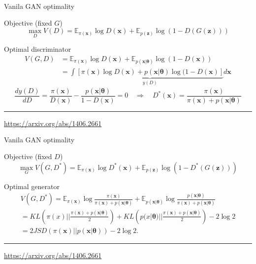 \documentclass{beamer}
\newcommand{\bx}{\mathbf{x}}
\newcommand{\bz}{\mathbf{z}}
\newcommand{\bbE}{\mathbb{E}}
\newcommand{\btheta}{\boldsymbol{\theta}}
\begin{document}
\begin{frame}{Vanila GAN optimality}
	
	\begin{block}{Objective (fixed $G$)}
		\[
		\max_D V(D) = \bbE_{\pi(\bx)} \log D(\bx) + \bbE_{p(\bz)} \log (1 - D(G(\bz)))
		\]
	\end{block}
	\begin{block}{Optimal discriminator}
		\vspace{-0.5cm}
		\begin{align*}
			V(G, D) &= \bbE_{\pi(\bx)} \log D(\bx) + \bbE_{p(\bx | \btheta)} \log (1 - D(\bx)) \\
			&= \int \underbrace{\left[ \pi(\bx) \log D(\bx) + p(\bx | \btheta)\log (1 - D(\bx) \right]}_{y(D)} d \bx
		\end{align*}
		\[
			\frac{d y(D)}{d D} = \frac{\pi(\bx)}{D(\bx)} - \frac{p(\bx | \btheta)}{1 - D(\bx)} = 0 \quad \Rightarrow \quad D^*(\bx) = \frac{\pi(\bx)}{\pi(\bx) + p(\bx | \btheta)}
		\]
	\end{block}
	\vfill
	\hrule\medskip
	{\scriptsize \href{https://arxiv.org/abs/1406.2661}{https://arxiv.org/abs/1406.2661}}

\end{frame}
\begin{frame}{Vanila GAN optimality}
	
	\begin{block}{Objective (fixed $D$)}
		\[
		\max_G V(G, D^*) = \bbE_{\pi(\bx)} \log D^*(\bx) + \bbE_{p(\bz)} \log (1 - D^*(G(\bz)))
		\]
	\end{block}
	\begin{block}{Optimal generator}
		\vspace{-0.5cm}
		\begin{multline*}
			V(G, D^*) = \bbE_{\pi(\bx)} \log \frac{\pi(\bx)}{\pi(\bx) + p(\bx | \btheta)} + \bbE_{p(\bx | \btheta)} \log \frac{p(\bx | \btheta)}{\pi(\bx) + p(\bx | \btheta)} \\
			 = KL \left(\pi(x) || \frac{\pi(\bx) + p(\bx | \btheta)}{2}\right) + KL \left(p(x | \btheta) || \frac{\pi(\bx) + p(\bx | \btheta)}{2}\right) - 2\log 2 \\
			 = 2JSD(\pi(\bx) || p(\bx | \btheta)) - 2\log 2.
		\end{multline*}
	\end{block}
	\vfill
	\hrule\medskip
	{\scriptsize \href{https://arxiv.org/abs/1406.2661}{https://arxiv.org/abs/1406.2661}}
	
\end{frame}
\end{document}
